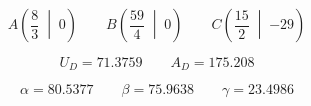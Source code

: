 \begin{equation*}
  A\left(\frac{\num{8}}{\num{3}}\;\middle|\;\num{0}\right)
  \qquad
  B\left(\frac{\num{59}}{\num{4}}\;\middle|\;\num{0}\right)
  \qquad
  C\left(\frac{\num{15}}{\num{2}}\;\middle|\;\num{-29}\right)
\end{equation*}

\begin{equation*}
  U_D=\num{71.3759}
  \qquad
  A_D=\num{175.208}
\end{equation*}

\begin{equation*}
  \alpha=\num{80.5377}
  \qquad
  \beta=\num{75.9638}
  \qquad
  \gamma=\num{23.4986}
\end{equation*}

